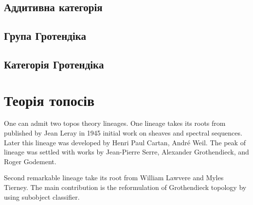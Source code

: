 \begin{definition}
\subsection{Аддитивна категорія}


\subsection{Група Гротендіка}

\subsection{Категорія Гротендіка}

\section{Теорія топосів}

One can admit two topos theory lineages. One lineage takes its roots from published
by Jean Leray in 1945 initial work on sheaves and spectral sequences. Later this lineage
was developed by Henri Paul Cartan, André Weil. The peak of lineage was settled
with works by Jean-Pierre Serre, Alexander Grothendieck, and Roger Godement.

Second remarkable lineage take its root from William Lawvere and
Myles Tierney. The main contribution is the reformulation of Grothendieck topology
by using subobject classifier.


\end{definition}
